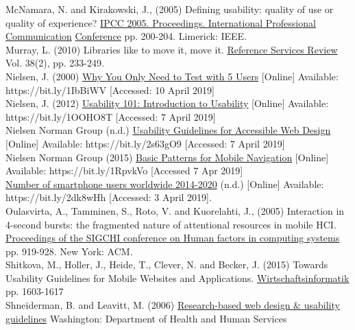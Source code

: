 \documentclass[version=last,fontsize=13pt]{scrartcl}
\begin{document}
McNamara, N. and Kirakowski, J., (2005)  Defining usability: quality of use or quality of experience?  \underline{IPCC 2005. Proceedings. International Professional Communication} \underline{Conference} pp. 200-204. Limerick: IEEE.\\

Murray, L. (2010) Libraries like to move it, move it.  \underline{Reference Services Review} Vol. 38(2), pp. 233-249.\\

Nielsen, J. (2000) \underline{Why You Only Need to Test with 5 Users} [Online] Available:\\  https://bit.ly/1IbBiWV [Accessed: 10 April 2019]\\

Nielsen, J. (2012) \underline{Usability 101: Introduction to Usability} [Online] Available:\\ https://bit.ly/1OOHO8T [Accessed: 7 April 2019]\\

Nielsen Norman Group (n.d.) \underline{Usability Guidelines for Accessible Web Design} [Online] Available:  https://bit.ly/2s63gO9 [Accessed: 7 April 2019]\\

Nielsen Norman Group (2015) \underline{Basic Patterns for Mobile Navigation} [Online] Available: https://bit.ly/1RpvkVo [Accessed 7 Apr 2019]\\

\underline{Number of smartphone users worldwide 2014-2020} (n.d.) [Online]  Available:\\ https://bit.ly/2dk8wHh [Accessed: 3 April 2019].\\

Oulasvirta, A., Tamminen, S., Roto, V. and Kuorelahti, J., (2005) Interaction in 4-second bursts: the fragmented nature of attentional resources in mobile HCI. \\

\underline{ Proceedings of the SIGCHI conference on Human factors in computing systems} pp. 919-928. New York: ACM. \\

Shitkova, M., Holler, J., Heide, T., Clever, N. and Becker, J. (2015)  Towards Usability Guidelines for Mobile Websites and Applications.  \underline{Wirtschaftsinformatik} pp. 1603-1617 \\

Shneiderman, B. and Leavitt, M. (2006) \underline{Research-based web design \& usability}\\ \underline{guidelines} Washington: Department of Health and Human Services\\
\end{document}
